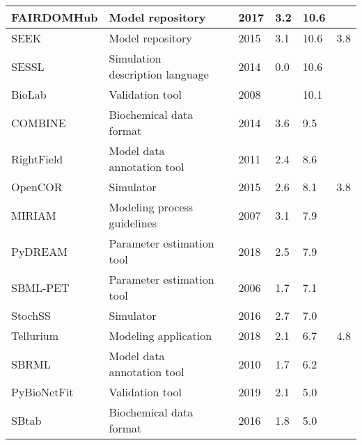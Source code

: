 \begin{longtable}{L{2.2cm}L{4cm}L{1cm}L{0.8cm}R{1.1cm}R{1cm}R{1cm}}
\midrule
\small{FAIRDOMHub} &\small{Model repository} &\cite{Wolstencroft2017FAIRDOMHub:Research.} &\small{2017} &\small{3.2} &\small{10.6} &\small{}\\
\midrule
\small{SEEK} &\small{Model repository} &\cite{Wolstencroft2015SEEK:Platform} &\small{2015} &\small{3.1} &\small{10.6} &\small{3.8}\\
\midrule
\small{SESSL} &\small{Simulation description language} &\cite{Ewald2014SESSL:Experiments} &\small{2014} &\small{0.0} &\small{10.6} &\small{}\\
\midrule
\small{BioLab} &\small{Validation tool} &\cite{Clarke2008StatisticalPathway} &\small{2008} &\small{} &\small{10.1} &\small{}\\
\midrule
\small{COMBINE} &\small{Biochemical data format} &\cite{Bergmann2014COMBINEProject} &\small{2014} &\small{3.6} &\small{9.5} &\small{}\\
\midrule
\small{RightField} &\small{Model data annotation tool} &\cite{Wolstencroft2011RightField:Spreadsheets} &\small{2011} &\small{2.4} &\small{8.6} &\small{}\\
\midrule
\small{OpenCOR} &\small{Simulator} &\cite{garny2015opencor} &\small{2015} &\small{2.6} &\small{8.1} &\small{3.8}\\
\midrule
\small{MIRIAM} &\small{Modeling process guidelines} &\cite{Laibe2007MIRIAMBiology.} &\small{2007} &\small{3.1} &\small{7.9} &\small{}\\
\midrule
\small{PyDREAM} &\small{Parameter estimation tool} &\cite{Shockley2018PyDREAM:Python} &\small{2018} &\small{2.5} &\small{7.9} &\small{}\\
\midrule
\small{SBML-PET} &\small{Parameter estimation tool} &\cite{Zi2006SBML-PET:Tool} &\small{2006} &\small{1.7} &\small{7.1} &\small{}\\
\midrule
\small{StochSS} &\small{Simulator} &\cite{drawert2016stochastic} &\small{2016} &\small{2.7} &\small{7.0} &\small{}\\
\midrule
\small{Tellurium} &\small{Modeling application} &\cite{Choi2018Tellurium:Biology} &\small{2018} &\small{2.1} &\small{6.7} &\small{4.8}\\
\midrule
\small{SBRML} &\small{Model data annotation tool} &\cite{Dada2010SBRML:Models} &\small{2010} &\small{1.7} &\small{6.2} &\small{}\\
\midrule
\small{PyBioNetFit} &\small{Validation tool} &\cite{Mitra2019PyBioNetFitLanguage} &\small{2019} &\small{2.1} &\small{5.0} &\small{}\\
\midrule
\small{SBtab} &\small{Biochemical data format} &\cite{Lubitz2016SBtab:Biology} &\small{2016} &\small{1.8} &\small{5.0} &\small{}\\

\end{longtable}
